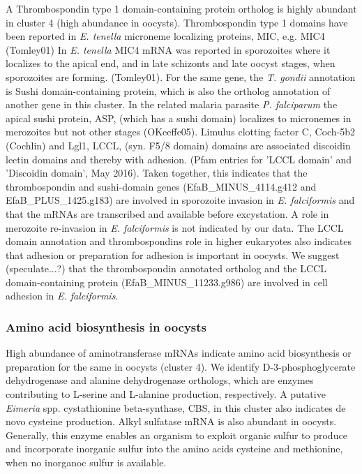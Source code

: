 \documentclass{bmcart}
\begin{document}
A Thrombospondin type 1 domain-containing protein ortholog is highly
abundant in cluster 4 (high abundance in oocysts). Thrombospondin type
1 domains have been reported in \textit{E. tenella} microneme
localizing proteins, MIC, e.g. MIC4 (Tomley01) In \textit{E. tenella}
MIC4 mRNA was reported in sporozoites where it localizes to the apical
end, and in late schizonts and late oocyst stages, when sporozoites
are forming. (Tomley01). For the same gene, the \textit{T. gondii}
annotation is Sushi domain-containing protein, which is also the
ortholog annotation of another gene in this cluster. In the related
malaria parasite \textit{P. falciparum} the apical sushi protein, ASP,
(which has a sushi domain) localizes to micronemes in merozoites but
not other stages (OKeeffe05).  Limulus clotting factor C, Coch-5b2
(Cochlin) and Lgl1, LCCL, (syn. F5/8 domain) domains are associated
discoidin lectin domains and thereby with adhesion.  (Pfam entries for
'LCCL domain' and 'Discoidin domain', May 2016).  Taken together, this
indicates that the thrombospondin and sushi-domain genes
(EfaB\_MINUS\_4114.g412 and EfaB\_PLUS\_1425.g183) are involved in
sporozoite invasion in \textit{E. falciformis} and that the mRNAs are
transcribed and available before excystation.  A role in merozoite
re-invasion in \textit{E. falciformis} is not indicated by our data.
The LCCL domain annotation and thrombospondins role in higher
eukaryotes also indicates that adhesion or preparation for adhesion is
important in oocysts.  We suggest (speculate...?) that the
thrombospondin annotated ortholog and the LCCL domain-containing
protein (EfaB\_MINUS\_11233.g986) are involved in cell adhesion in
\textit{E. falciformis}.

\subsubsection*{Amino acid biosynthesis in oocysts}
High abundance of aminotransferase mRNAs indicate amino acid
biosynthesis or preparation for the same in oocysts (cluster 4).  We
identify D-3-phosphoglycerate dehydrogenase and alanine dehydrogenase
orthologs, which are enzymes contributing to L-serine and L-alanine
production, respectively. A putative \textit{Eimeria}
spp. cystathionine beta-synthase, CBS, in this cluster also indicates
de novo cysteine production. Alkyl sulfatase mRNA is also abundant in
oocysts. Generally, this enzyme enables an organism to exploit organic
sulfur to produce and incorporate inorganic sulfur into the amino
acids cysteine and methionine, when no inorganoc sulfur is available.
\end{document}
